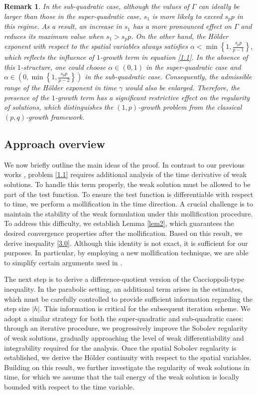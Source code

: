 \documentclass[reqno,10pt]{amsart}
\numberwithin{equation}{section}
\newtheorem{remark}[theorem]{Remark}
\begin{document}
\begin{remark}
	In the sub-quadratic case, although the values of $\Gamma$ can ideally be larger than those in the super-quadratic case, $s_1$ is more likely to exceed $s_pp$ in this regime. As a result, an increase in $s_1$ has a more pronounced effect on $\Gamma$ and reduces its maximum value when $s_1>s_pp$. On the other hand, the H\"{o}lder exponent with respect to the spatial variables always satisfies $\alpha<\min\left\lbrace 1, \frac{s_pp}{p-1}\right\rbrace$,
	which reflects the influence of  $1$-growth term in equation \eqref{1.1}. In the absence of this $1$-structure, one could choose $\alpha\in(0, 1)$ in the super-quadratic case and $\alpha\in\left(0, \min\left\lbrace 1,\frac{s_pp}{p-2}\right\rbrace\right)$
	in the sub-quadratic case. Consequently, the admissible range of the H\"{o}lder exponent in time $\gamma$ would also be enlarged. Therefore, the presence of the $1$-growth term has a significant restrictive effect on the regularity of solutions, which distinguishes the $(1, p)$-growth problem from the classical $(p, q)$-growth framework.
\end{remark}

\subsection{Approach overview}

We now briefly outline the main ideas of the proof. In contrast to our previous works \cite{LZ25, LZ2501}, problem \eqref{1.1} requires additional analysis of the time derivative of weak solutions. To handle this term properly, the weak solution must be allowed to be part of the test function. To ensure the test function is differentiable with respect to time, we perform a mollification in the time direction. A crucial challenge is to maintain the stability of the weak formulation under this mollification procedure. To address this difficulty, we establish Lemma \ref{lem2}, which guarantees the desired convergence properties after the mollification. Based on this result, we derive inequality \eqref{3.0}. Although this identity is not exact, it is sufficient for our purposes. In particular, by employing a new mollification technique, we are able to simplify certain arguments used in \cite{BLS21}.

The next step is to derive a difference-quotient version of the Caccioppoli-type inequality. In the parabolic setting, an additional term arises in the estimates, which must be carefully controlled to provide sufficient information regarding the step size $|h|$. This information is critical for the subsequent iteration scheme. We adopt a similar strategy for both the super-quadratic and sub-quadratic cases: through an iterative procedure, we progressively improve the Sobolev regularity of weak solutions, gradually approaching the level of weak differentiability and integrability required for the analysis. Once the spatial Sobolev regularity is established, we derive the H\"{o}lder continuity with respect to the spatial variables. Building on this result, we further investigate the regularity of weak solutions in time, for which we assume that the tail energy of the weak solution is locally bounded with respect to the time variable.
 
\end{document}
